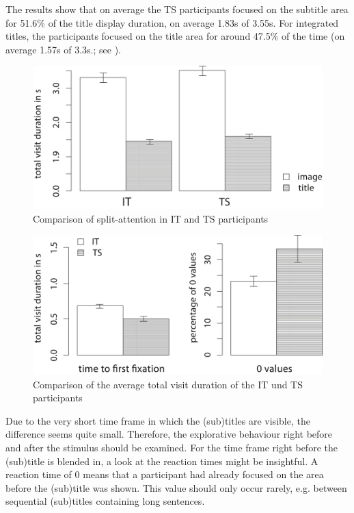 \documentclass[output=paper]{langsci/langscibook}
\begin{document}
The results show that on average the TS participants focused on the subtitle area for 51.6\% of the title display duration, on average 1.83s of 3.55s. For integrated titles, the participants focused on the title area for around 47.5\% of the time (on average 1.57s of 3.3s.; see ).


\begin{figure} 
  \includegraphics[height=.3\textheight]{figures/Fox7.pdf}
  \caption{Comparison of split-attention in IT and TS participants}
  \label{fox:fig:7}
\end{figure}

\begin{figure} 
  \includegraphics[height=.3\textheight]{figures/Fox8.pdf}
  \caption{Comparison of the average total visit duration of the IT und TS participants}
  \label{fox:fig:8}
\end{figure}


Due to the very short time frame in which the (sub)titles are visible, the difference seems quite small. Therefore, the explorative behaviour right before and after the stimulus should be examined. For the time frame right before the (sub)title is blended in, a look at the reaction times might be insightful. A reaction time of 0 means that a participant had already focused on the area before the (sub)title was shown. This value should only occur rarely, e.g. between sequential (sub)titles containing long sentences.
\end{document}
